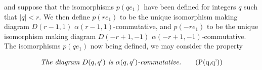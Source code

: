 and suppose that the isomorphisms $p(qe_1)$ have been defined for
integers $q$ such that $|q|<r$. We then define $p(re_1)$ to be the
unique isomorphism making diagram $D(r-1,1)$
$\alpha(r-1,1)$-commutative, and $p(-re_1)$ to be the unique
isomorphism making diagram $D(-r+1,-1)$
$\alpha(-r+1,-1)$-commutative. The isomorphisms $p(qe_1)$ now being
defined, we may consider the property

\begin{equation}
  \text{\emph{The diagram $D(q,q')$ is $\alpha(q,q')$-commutative.}}
  \tag{P(q,q')}
\end{equation}
